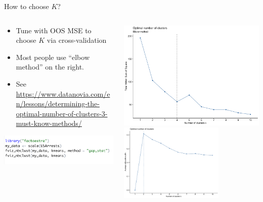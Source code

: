 \documentclass[xcolor=pdftex,dvipsnames,table,mathserif,aspectratio=169]{beamer}
\begin{document}
\begin{frame}[fragile]{How to choose $K$?}

\begin{columns}
\begin{column}{0.5\textwidth}
  \begin{itemize}
\item Tune with OOS MSE to choose $K$ via cross-validation
\item Most people use ``elbow method'' on the right.
\item See \url{https://www.datanovia.com/en/lessons/determining-the-optimal-number-of-clusters-3-must-know-methods/}
  \end{itemize}
  \centering
\includegraphics[height=0.2\textheight]{./resources/k_means_code.png}
\end{column}
\begin{column}{0.5\textwidth}  %
    \begin{center}
\includegraphics[height=0.5\textwidth]{./resources/k_means_fit1.png}\\
\includegraphics[width=0.7\textwidth]{./resources/k_means_fit2.png}\\
     \end{center}
\end{column}
\end{columns}

\end{frame}
\end{document}

